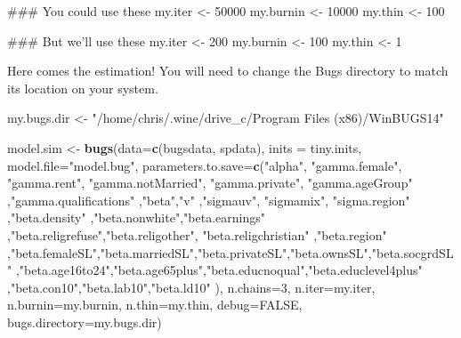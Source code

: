 \documentclass[12pt,twoside]{article}
\newenvironment{Shaded}{}{}
\newcommand{\KeywordTok}[1]{\textcolor[rgb]{0.00,0.44,0.13}{\textbf{{#1}}}}
\newcommand{\DataTypeTok}[1]{\textcolor[rgb]{0.56,0.13,0.00}{{#1}}}
\newcommand{\DecValTok}[1]{\textcolor[rgb]{0.25,0.63,0.44}{{#1}}}
\newcommand{\StringTok}[1]{\textcolor[rgb]{0.25,0.44,0.63}{{#1}}}
\newcommand{\OtherTok}[1]{\textcolor[rgb]{0.00,0.44,0.13}{{#1}}}
\newcommand{\NormalTok}[1]{{#1}}
\begin{document}
\begin{Shaded}
\begin{Highlighting}[]
\NormalTok{### You could use these}
\NormalTok{my.iter <-}\StringTok{ }\DecValTok{50000}
\NormalTok{my.burnin <-}\StringTok{ }\DecValTok{10000}
\NormalTok{my.thin <-}\StringTok{ }\DecValTok{100}

\NormalTok{### But we'll use these}
\NormalTok{my.iter <-}\StringTok{ }\DecValTok{200}
\NormalTok{my.burnin <-}\StringTok{ }\DecValTok{100}
\NormalTok{my.thin <-}\StringTok{ }\DecValTok{1}
\end{Highlighting}
\end{Shaded}

Here comes the estimation! You will need to change the Bugs directory to
match its location on your system.

\begin{Shaded}
\begin{Highlighting}[]
\NormalTok{my.bugs.dir <-}\StringTok{ "/home/chris/.wine/drive_c/Program Files (x86)/WinBUGS14"}

\NormalTok{model.sim <-}\StringTok{ }\KeywordTok{bugs}\NormalTok{(}\DataTypeTok{data=}\KeywordTok{c}\NormalTok{(bugsdata, spdata), }
        \DataTypeTok{inits =} \NormalTok{tiny.inits,}
     \DataTypeTok{model.file=}\StringTok{"model.bug"}\NormalTok{,}
      \DataTypeTok{parameters.to.save=}\KeywordTok{c}\NormalTok{(}\StringTok{"alpha"}\NormalTok{,}
        \StringTok{"gamma.female"}\NormalTok{,}
        \StringTok{"gamma.rent"}\NormalTok{,}
        \StringTok{"gamma.notMarried"}\NormalTok{,}
        \StringTok{"gamma.private"}\NormalTok{,}
        \StringTok{"gamma.ageGroup"}
        \NormalTok{,}\StringTok{"gamma.qualifications"}
        \NormalTok{,}\StringTok{"beta"}\NormalTok{,}\StringTok{"v"}
        \NormalTok{,}\StringTok{"sigmauv"}\NormalTok{, }\StringTok{"sigmamix"}\NormalTok{, }\StringTok{"sigma.region"}
        \NormalTok{,}\StringTok{"beta.density"}
        \NormalTok{,}\StringTok{"beta.nonwhite"}\NormalTok{,}\StringTok{"beta.earnings"}
        \NormalTok{,}\StringTok{"beta.religrefuse"}\NormalTok{,}\StringTok{"beta.religother"}\NormalTok{, }\StringTok{"beta.religchristian"}
        \NormalTok{,}\StringTok{"beta.region"}
        \NormalTok{,}\StringTok{"beta.femaleSL"}\NormalTok{,}\StringTok{"beta.marriedSL"}\NormalTok{,}\StringTok{"beta.privateSL"}\NormalTok{,}\StringTok{"beta.ownsSL"}\NormalTok{,}\StringTok{"beta.socgrdSL"}
        \NormalTok{,}\StringTok{"beta.age16to24"}\NormalTok{,}\StringTok{"beta.age65plus"}\NormalTok{,}\StringTok{"beta.educnoqual"}\NormalTok{,}\StringTok{"beta.educlevel4plus"}
        \NormalTok{,}\StringTok{"beta.con10"}\NormalTok{,}\StringTok{"beta.lab10"}\NormalTok{,}\StringTok{"beta.ld10"}
        \NormalTok{), }
      \DataTypeTok{n.chains=}\DecValTok{3}\NormalTok{,}
      \DataTypeTok{n.iter=}\NormalTok{my.iter, }
      \DataTypeTok{n.burnin=}\NormalTok{my.burnin, }
      \DataTypeTok{n.thin=}\NormalTok{my.thin, }
      \DataTypeTok{debug=}\OtherTok{FALSE}\NormalTok{,}
      \DataTypeTok{bugs.directory=}\NormalTok{my.bugs.dir) }
\end{Highlighting}
\end{Shaded}
\end{document}
